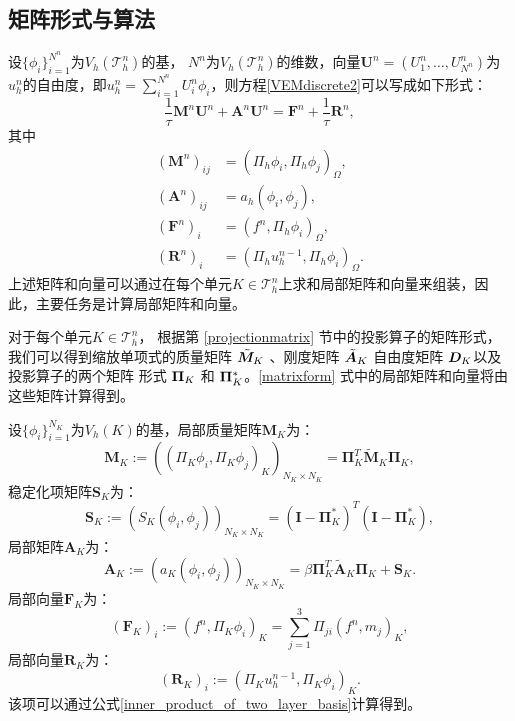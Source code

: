 \subsection{矩阵形式与算法}
\label{matrixformulation}
设$\{\phi_i\}_{i=1}^{N^n}$为$V_h(\mathcal{T}^n_h)$的基，
$N^n$为$V_h(\mathcal{T}^n_h)$的维数，向量$\boldsymbol{U}^n
= (U^n_1, \dots, U^n_{N^n})$为$u_h^n$的自由度，即$u_h^n = \sum_{i=1}^{N^n} U^n_i
\phi_i$，则方程\eqref{VEMdiscrete2}可以写成如下形式：
\begin{equation}
\label{matrixform}
\frac{1}{\tau}\boldsymbol{M}^n \boldsymbol{U}^n + \boldsymbol{A}^n \boldsymbol{U}^n =
\boldsymbol{F}^n + \frac{1}{\tau}\boldsymbol{R}^n,
\end{equation}
其中
$$
\begin{aligned}
(\boldsymbol{M}^n)_{ij} & = (\Pi_h \phi_i, \Pi_h \phi_j)_{\Omega},\\
(\boldsymbol{A}^n)_{ij} & = a_h(\phi_i, \phi_j),\\
(\boldsymbol{F}^n)_i & = (f^n, \Pi_h \phi_i)_{\Omega},\\
(\boldsymbol{R}^n)_i & = (\Pi_h u_h^{n-1}, \Pi_h \phi_i)_{\Omega}.
\end{aligned}
$$
上述矩阵和向量可以通过在每个单元$K \in \mathcal{T}_h^n$上求和局部矩阵和向量来组装，因此，主要任务是计算局部矩阵和向量。

对于每个单元$K \in \mathcal{T}_h^n$，
根据第 \ref{projectionmatrix}
节中的投影算子的矩阵形式，我们可以得到缩放单项式的质量矩阵 $\tilde{\boldsymbol{M}}_K$
、刚度矩阵 $\tilde{\boldsymbol{A}}_K$ 自由度矩阵 $\boldsymbol{D}_K$以及投影算子的两个矩阵
形式 $\boldsymbol{\Pi}_K$ 和 $\boldsymbol{\Pi}_K^*$。\eqref{matrixform} 式中的局部矩阵和向量将由
这些矩阵计算得到。

设$\{\phi_i\}_{i=1}^{N_K}$为$V_h(K)$的基，局部质量矩阵$\boldsymbol{M}_K$为：
$$
\boldsymbol{M}_K := ((\Pi_K \phi_i, \Pi_K \phi_j)_K)_{N_K\times N_K} =
\boldsymbol{\Pi}_K^T \tilde{\boldsymbol{M}}_K \boldsymbol{\Pi}_K,
$$
稳定化项矩阵$\boldsymbol{S}_K$为：
$$
\boldsymbol{S}_K := (S_K(\phi_i, \phi_j))_{N_K\times N_K} =
(\boldsymbol{I}-\boldsymbol{\Pi}_K^*)^T 
(\boldsymbol{I}-\boldsymbol{\Pi}_K^*),
$$
局部矩阵$\boldsymbol{A}_K$为：
$$
\boldsymbol{A}_K := (a_K(\phi_i, \phi_j))_{N_K\times N_K} =
\beta\boldsymbol{\Pi}_K^T \boldsymbol{\tilde{A}}_K \boldsymbol{\Pi}_K +
\boldsymbol{S}_K.
$$
局部向量$\boldsymbol{F}_K$为：
$$
(\boldsymbol{F}_K)_i := (f^n, \Pi_K \phi_i)_K =
\sum_{j=1}^3 \Pi_{ji}(f^n, m_j)_K,
$$
局部向量$\boldsymbol{R}_K$为：
$$
(\boldsymbol{R}_K)_i := (\Pi_K u_h^{n-1}, \Pi_K \phi_i)_K.
$$
该项可以通过公式\ref{inner_product_of_two_layer_basis}计算得到。

